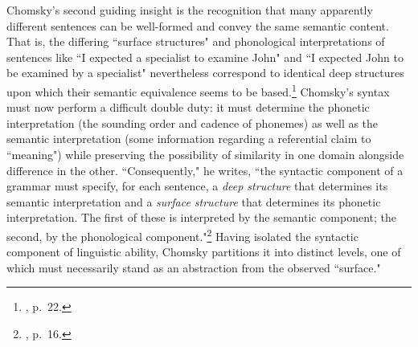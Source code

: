 Chomsky's second guiding insight is the recognition that many apparently different sentences can be well-formed and convey the same semantic content.  That is, the differing ``surface structures" and phonological interpretations of sentences like ``I expected a specialist to examine John" and ``I expected John to be examined by a specialist" nevertheless correspond to identical deep structures upon which their semantic equivalence seems to be based.\footnote{\cite{chomsky1965}, p.\ 22.}  Chomsky's syntax must now perform a difficult double duty: it must determine the phonetic interpretation (the sounding order and cadence of phonemes) as well as the semantic interpretation (some information regarding a referential claim to ``meaning") while preserving the possibility of similarity in one domain alongside difference in the other.  ``Consequently," he writes, ``the syntactic component of a grammar must specify, for each sentence, a \emph{deep structure} that determines its semantic interpretation and a \emph{surface structure} that determines its phonetic interpretation.  The first of these is interpreted by the semantic component; the second, by the phonological component."\footnote{\cite{chomsky1965}, p.\ 16.}  Having isolated the syntactic component of linguistic ability, Chomsky partitions it into distinct levels, one of which must necessarily stand as an abstraction from the observed ``surface."

